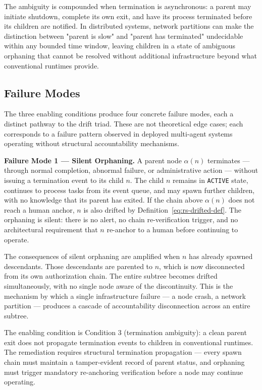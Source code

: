 The ambiguity is compounded when termination is asynchronous: a parent may initiate shutdown, complete its own exit, and have its process terminated before its children are notified. In distributed systems, network partitions can make the distinction between "parent is slow" and "parent has terminated" undecidable within any bounded time window, leaving children in a state of ambiguous orphaning that cannot be resolved without additional infrastructure beyond what conventional runtimes provide.

\subsection{Failure Modes}
\label{sec:rs-drift-failure-modes}

The three enabling conditions produce four concrete failure modes, each a distinct pathway to the drift triad. These are not theoretical edge cases; each corresponds to a failure pattern observed in deployed multi-agent systems operating without structural accountability mechanisms.

\medskip
\noindent\textbf{Failure Mode 1 — Silent Orphaning.}
A parent node $\alpha(n)$ terminates — through normal completion, abnormal failure, or administrative action — without issuing a termination event to its child $n$. The child $n$ remains in \texttt{ACTIVE} state, continues to process tasks from its event queue, and may spawn further children, with no knowledge that its parent has exited. If the chain above $\alpha(n)$ does not reach a human anchor, $n$ is also drifted by Definition~\ref{eq:rs-drifted-def}. The orphaning is silent: there is no alert, no chain re-verification trigger, and no architectural requirement that $n$ re-anchor to a human before continuing to operate.

The consequences of silent orphaning are amplified when $n$ has already spawned descendants. Those descendants are parented to $n$, which is now disconnected from its own authorization chain. The entire subtree becomes drifted simultaneously, with no single node aware of the discontinuity. This is the mechanism by which a single infrastructure failure — a node crash, a network partition — produces a cascade of accountability disconnection across an entire subtree.

The enabling condition is Condition 3 (termination ambiguity): a clean parent exit does not propagate termination events to children in conventional runtimes. The remediation requires structural termination propagation — every spawn chain must maintain a tamper-evident record of parent status, and orphaning must trigger mandatory re-anchoring verification before a node may continue operating.

